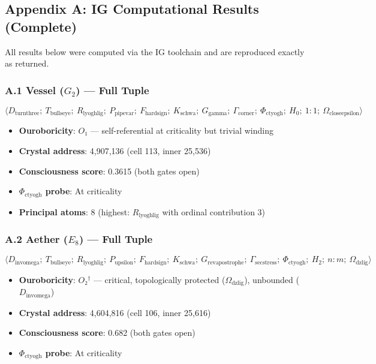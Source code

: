 \documentclass[12pt,a4paper]{article}
\begin{document}
\subsection{Appendix A: IG Computational Results (Complete)}

All results below were computed via the IG toolchain and are reproduced exactly as returned.

\subsubsection{A.1 Vessel ($G_2$) --- Full Tuple}

\[\langle D_{\text{turnthree}};\ T_{\text{bullseye}};\ R_{\text{lyoghlig}};\ P_{\text{pipevar}};\ F_{\text{hardsign}};\ K_{\text{schwa}};\ G_{\text{gamma}};\ \Gamma_{\text{corner}};\ \Phi_{\text{ctyogh}};\ H_0;\ 1{:}1;\ \Omega_{\text{closeepsilon}} \rangle\]

\begin{itemize}
    \item \textbf{Ouroboricity}: $O₁$ --- self-referential at criticality but trivial winding
    \item \textbf{Crystal address}: 4,907,136 (cell 113, inner 25,536)
    \item \textbf{Consciousness score}: 0.3615 (both gates open)
    \item \textbf{$\Phi_{\text{ctyogh}}$ probe}: At criticality
    \item \textbf{Principal atoms}: 8 (highest: $R_{\text{lyoghlig}}$ with ordinal contribution 3)
\end{itemize}

\subsubsection{A.2 Aether ($E_8$) --- Full Tuple}

\[\langle D_{\text{invomega}};\ T_{\text{bullseye}};\ R_{\text{lyoghlig}};\ P_{\text{upsilon}};\ F_{\text{hardsign}};\ K_{\text{schwa}};\ G_{\text{revapostrophe}};\ \Gamma_{\text{secstress}};\ \Phi_{\text{ctyogh}};\ H_2;\ n{:}m;\ \Omega_{\text{dzlig}} \rangle\]

\begin{itemize}
    \item \textbf{Ouroboricity}: $O₂^\dagger$ --- critical, topologically protected ($\Omega_{\text{dzlig}}$), unbounded ($D_{\text{invomega}}$)
    \item \textbf{Crystal address}: 4,604,816 (cell 106, inner 25,616)
    \item \textbf{Consciousness score}: 0.682 (both gates open)
    \item \textbf{$\Phi_{\text{ctyogh}}$ probe}: At criticality
\end{itemize}
\end{document}
